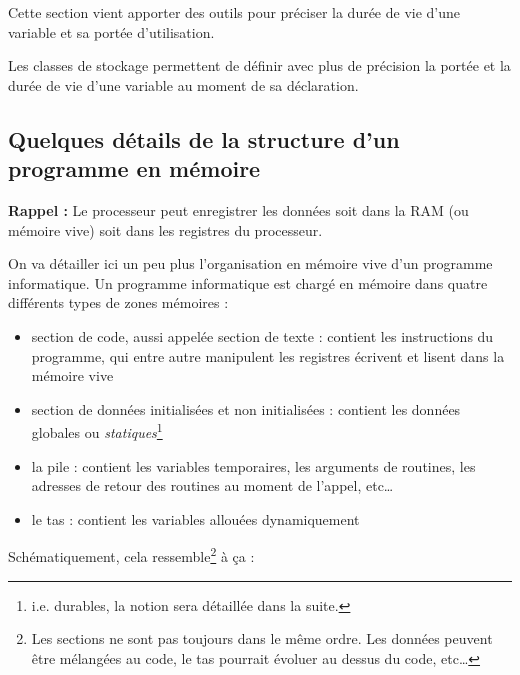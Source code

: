\documentclass[../../../main.tex]{subfiles}
\begin{document}
Cette section vient apporter des outils pour préciser la durée de vie d'une variable et sa portée d'utilisation.

Les classes de stockage permettent de définir avec plus de précision la portée et la durée de vie d'une variable au moment de sa déclaration.
\subsection{Quelques détails de la structure d'un programme en mémoire}
\label{sub:quelques_d_tails_de_la_structure_d_un_programme_en_m_moire}
\textbf{Rappel :} Le processeur peut enregistrer les données soit dans la RAM (ou mémoire vive) soit dans les registres du processeur.

On va détailler ici un peu plus l'organisation en mémoire vive d'un programme informatique. Un programme informatique est chargé en mémoire dans quatre différents types de zones mémoires :
\begin{itemize}
	\item section de code, aussi appelée section de texte : contient les instructions du programme, qui entre autre manipulent les registres écrivent et lisent dans la mémoire vive
	\item section de données initialisées et non initialisées : contient les données globales ou \textit{statiques}\footnote{i.e. durables, la notion sera détaillée dans la suite.}
	\item la pile : contient les variables temporaires, les arguments de routines, les adresses de retour des routines au moment de l'appel, etc\dots
	\item le tas : contient les variables allouées dynamiquement
\end{itemize}
Schématiquement, cela ressemble\footnote{Les sections ne sont pas toujours dans le même ordre. Les données peuvent être mélangées au code, le tas pourrait évoluer au dessus du code, etc\dots} à ça :
\end{document}
